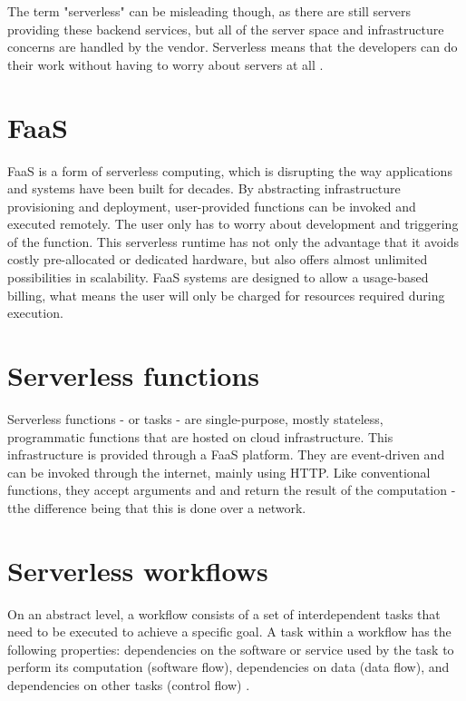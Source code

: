 \documentclass[a4paper,top=25mm,bottom=25mm,12pt,pdftex,halfparskip,twoside,openany,bibtotoc,numbers=noenddot]{scrbook}
\begin{document}
The term "serverless" can be misleading though, as there are still servers providing these backend services, but all of the server space and infrastructure concerns are handled by the vendor. Serverless means that the developers can do their work without having to worry about servers at all \cite{online-what-is-serverless-cloudflare}.

\section{FaaS}

FaaS is a form of serverless computing, which is disrupting the way applications and systems have been built for decades. By abstracting infrastructure provisioning and deployment, user-provided functions can be invoked and executed remotely. The user only has to worry about development and triggering of the function. This serverless runtime has not only the advantage that it avoids costly pre-allocated or dedicated hardware, but also offers almost unlimited possibilities in scalability. FaaS systems are designed to allow a usage-based billing, what means the user will only be charged for resources required during execution.

\section{Serverless functions}
Serverless functions - or tasks - are single-purpose, mostly stateless, programmatic functions that are hosted on cloud infrastructure. This infrastructure is provided through a FaaS platform. They are event-driven and can be invoked through the internet, mainly using HTTP. Like conventional functions, they accept arguments and and return the result of the computation  - tthe difference being that this is done over a network.

\section{Serverless workflows}
On an abstract level, a workflow consists of a set of interdependent tasks that need to be executed to achieve a specific goal. A task within a workflow has the following properties: dependencies on the software or service used by the task to perform its computation (software flow), dependencies on data (data flow), and dependencies on other tasks (control flow) \cite{thesis-design-serverless-worfklow-system-eyk}.\\
\end{document}
